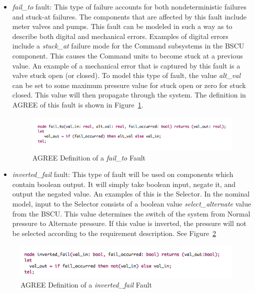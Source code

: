 \begin{itemize}
\item \textit{fail\_to} fault: This type of failure accounts for both nondeterministic failures and stuck-at failures. The components that are affected by this fault include meter valves and pumps. This fault can be modeled in such a way as to describe both digital and mechanical errors. Examples of digital errors include a \textit{stuck\_at} failure mode for the Command subsystems in the BSCU component. This causes the Command units to become stuck at a previous value. An example of a mechanical error that is captured by this fault is a valve stuck open (or closed). To model this type of fault, the value \textit{alt\_val} can be set to some maximum pressure value for stuck open or zero for stuck closed. This value will then propagate through the system. The definition in AGREE of this fault is shown in Figure~\ref{fig:fail_to_node}.\\

\begin{figure}[h!]
  \centering
 \includegraphics[width=1\textwidth]{images/fail_to.png}
  \vspace{-0.1in}
  \caption{AGREE Definition of a \textit{fail\_to} Fault}
  \label{fig:fail_to_node}
\end{figure}


\item \textit{inverted\_fail} fault: This type of fault will be used on components which contain boolean output. It will simply take boolean input, negate it, and output the negated value. An examples of this is the Selector. In the nominal model, input to the Selector consists of a boolean value \textit{select\_alternate} value from the BSCU. This value determines the switch of the system from Normal pressure to Alternate pressure. If this value is inverted, the pressure will not be selected according to the requirement description.  See Figure~\ref{fig:inverted_fail_node}

\end{itemize}

\begin{figure}[h!]
  \centering
 \includegraphics[width=1\textwidth]{images/inverted_fail.png}
  \vspace{-0.1in}
  \caption{AGREE Definition of a \textit{inverted\_fail} Fault}
  \label{fig:inverted_fail_node}
\end{figure}

